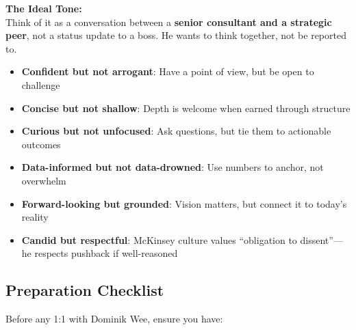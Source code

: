 \documentclass[11pt,a4paper]{article}
\begin{document}
\begin{center}
\begin{tcolorbox}[
    colback=mslightgray,
    colframe=msblue,
    boxrule=1pt,
    arc=3pt,
    left=10pt, right=10pt, top=10pt, bottom=10pt,
    width=0.95\textwidth
]
\textbf{The Ideal Tone:}\\[8pt]
Think of it as a conversation between a \textbf{senior consultant and a strategic peer}, not a status update to a boss. He wants to think together, not be reported to.

\begin{itemize}
    \item \textbf{Confident but not arrogant}: Have a point of view, but be open to challenge
    \item \textbf{Concise but not shallow}: Depth is welcome when earned through structure
    \item \textbf{Curious but not unfocused}: Ask questions, but tie them to actionable outcomes
    \item \textbf{Data-informed but not data-drowned}: Use numbers to anchor, not overwhelm
    \item \textbf{Forward-looking but grounded}: Vision matters, but connect it to today's reality
    \item \textbf{Candid but respectful}: McKinsey culture values ``obligation to dissent''---he respects pushback if well-reasoned
\end{itemize}
\end{tcolorbox}
\end{center}

\subsection{Preparation Checklist}

Before any 1:1 with Dominik Wee, ensure you have:
\end{document}
